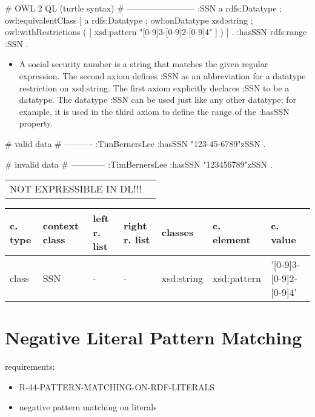 \documentclass{llncs}
\newenvironment{gcotable}{
  \scriptsize
  \sffamily
  \vspace{0.3cm}
	\begin{center}
  \begin{tabular}{l|l|l|l|l|l|l}
  \hline
  \textbf{c. type} & \textbf{context class} & \textbf{left r. list} & \textbf{right r. list} & \textbf{classes} & \textbf{c. element} & \textbf{c. value} \\
  \hline

}{
  \hline
  \end{tabular}
	\end{center}
}
\newenvironment{DL}{
	\begin{center}
  \begin{tabular}{r l}

}{
  \end{tabular}
	\end{center}
}
\begin{document}
\begin{ex}
# OWL 2 QL (turtle syntax)
# ------------------------
:SSN 
    a rdfs:Datatype ;
    owl:equivalentClass [
        a rdfs:Datatype ;
        owl:onDatatype xsd:string ;
        owl:withRestrictions ( 
            [ xsd:pattern "[0-9]{3}-[0-9]{2}-[0-9]{4}" ] ) ] .
:hasSSN rdfs:range :SSN .
\end{ex}

\begin{itemize}
	\item A social security number is a string that matches the given regular expression. 
The second axiom defines :SSN as an abbreviation for a datatype restriction on xsd:string. 
The first axiom explicitly declares :SSN to be a datatype. 
The datatype :SSN can be used just like any other datatype; 
for example, it is used in the third axiom to define the range of the :hasSSN property. 
\end{itemize}

\begin{ex}
# valid data
# ----------
:TimBernersLee
    :hasSSN "123-45-6789"^^:SSN .
\end{ex}

\begin{ex}
# invalid data
# ------------
:TimBernersLee
    :hasSSN "123456789"^^:SSN .
\end{ex}

\begin{DL}
NOT EXPRESSIBLE IN DL!!!
\end{DL}

\begin{gcotable}
class & SSN & - & - & xsd:string & xsd:pattern & '[0-9]{3}-[0-9]{2}-[0-9]{4}' \\
\end{gcotable}

\section{Negative Literal Pattern Matching}

requirements:

\begin{itemize}
  \item R-44-PATTERN-MATCHING-ON-RDF-LITERALS
\end{itemize}



\begin{itemize}
	\item negative pattern matching on literals
\end{itemize}
\end{document}
